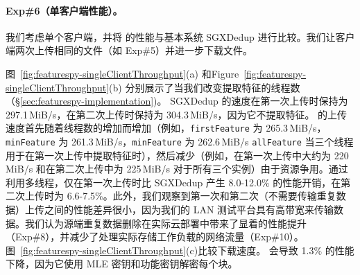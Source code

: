 \paragraph*{Exp\#6（单客户端性能）。}
我们考虑单个客户端，并将 \prototype 的性能与基本系统 SGXDedup 进行比较。我们让客户端两次上传相同的文件（如 Exp\#5）并进一步下载文件。


图~\ref{fig:featurespy-singleClientThroughput}(a) 和Figure~\ref{fig:featurespy-singleClientThroughput}(b) 分别展示了当我们改变提取特征的线程数（\S\ref{sec:featurespy-implementation})。 SGXDedup 的速度在第一次上传时保持为 297.1\,MiB/s，在第二次上传时保持为 304.3\,MiB/s，因为它不提取特征。 \prototype 的上传速度首先随着线程数的增加而增加（例如，{\tt firstFeature} 为 265.3\,MiB/s，{\tt minFeature} 为 261.3\,MiB/s，{\tt minFeature} 为 262.6\,MiB/s {\tt allFeature} 当三个线程用于在第一次上传中提取特征时），然后减少（例如，在第一次上传中大约为 220\,MiB/s 和在第二次上传中为 225\,MiB/s 对于所有三个实例）由于资源争用。通过利用多线程，\prototype 仅在第一次上传时比 SGXDedup 产生 8.0-12.0\% 的性能开销，在第二次上传时为 6.6-7.5\%。此外，我们观察到第一次和第二次（不需要传输重复数据）上传之间的性能差异很小，因为我们的 LAN 测试平台具有高带宽来传输数据。我们认为源端重复数据删除在实际云部署中带来了显着的性能提升（Exp\#8），并减少了处理实际存储工作负载的网络流量（Exp\#10）。图~\ref{fig:featurespy-singleClientThroughput}(c)比较下载速度。 \prototype 会导致 1.3\% 的性能下降，因为它使用 MLE 密钥和功能密钥解密每个块。



